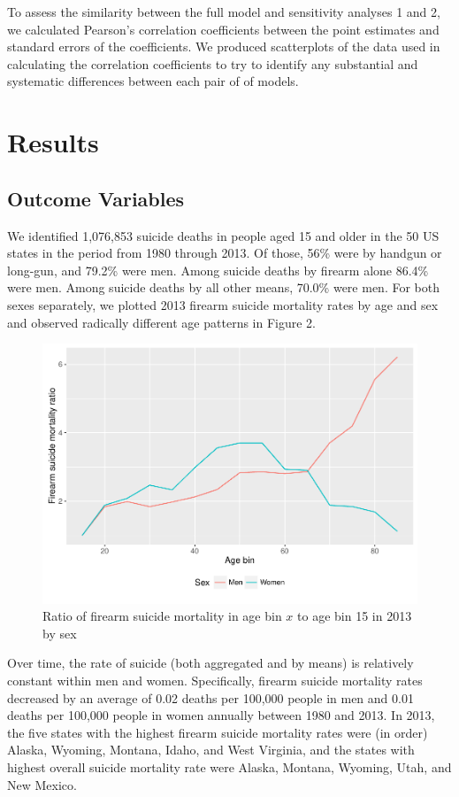 \documentclass[]{article}
\begin{document}
To assess the similarity between the full model and sensitivity analyses
1 and 2, we calculated Pearson's correlation coefficients between the
point estimates and standard errors of the coefficients. We produced
scatterplots of the data used in calculating the correlation
coefficients to try to identify any substantial and systematic
differences between each pair of of models.

\section{Results}\label{results}

\subsection{Outcome Variables}\label{outcome-variables}

We identified 1,076,853 suicide deaths in people aged 15 and older in
the 50 US states in the period from 1980 through 2013. Of those, 56\%
were by handgun or long-gun, and 79.2\% were men. Among suicide deaths
by firearm alone 86.4\% were men. Among suicide deaths by all other
means, 70.0\% were men. For both sexes separately, we plotted 2013
firearm suicide mortality rates by age and sex and observed radically
different age patterns in Figure 2.

\begin{figure}[htbp]
\centering
\includegraphics{Thesis_files/figure-latex/age-plot-1.pdf}
\caption{Ratio of firearm suicide mortality in age bin \(x\) to age bin
15 in 2013 by sex}
\end{figure}

Over time, the rate of suicide (both aggregated and by means) is
relatively constant within men and women. Specifically, firearm suicide
mortality rates decreased by an average of 0.02 deaths per 100,000
people in men and 0.01 deaths per 100,000 people in women annually
between 1980 and 2013. In 2013, the five states with the highest firearm
suicide mortality rates were (in order) Alaska, Wyoming, Montana, Idaho,
and West Virginia, and the states with highest overall suicide mortality
rate were Alaska, Montana, Wyoming, Utah, and New Mexico.
\end{document}
